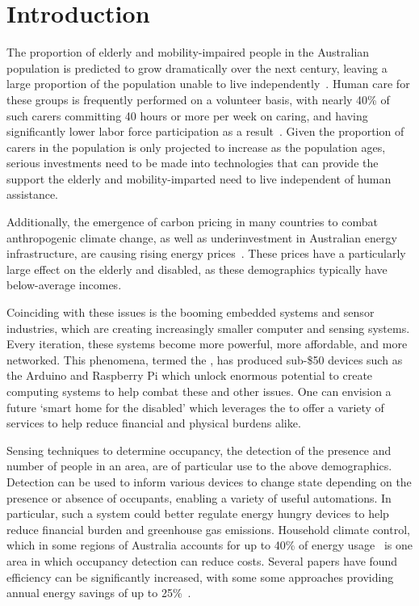 \documentclass[../thesis/thesis.tex]{subfiles}
\begin{document}
\chapter{Introduction}
The proportion of elderly and mobility-impaired people in the Australian population is predicted to grow dramatically over the next century, leaving a large proportion of the population unable to live independently~\cite{chan2009smart}. Human care for these groups is frequently performed on a volunteer basis, with nearly 40\% of such carers committing 40 hours or more per week on caring, and having significantly lower labor force participation as a result~\cite{abs4430}. Given the proportion of carers in the population is only projected to increase as the population ages, serious investments need to be made into technologies that can provide the support the elderly and mobility-imparted need to live independent of human assistance.

Additionally, the emergence of carbon pricing in many countries to combat anthropogenic climate change, as well as underinvestment in Australian energy infrastructure, are causing rising energy prices~\cite{energyprices}. These prices have a particularly large effect on the elderly and disabled, as these demographics typically have below-average incomes.

Coinciding with these issues is the booming embedded systems and sensor industries, which are creating increasingly smaller computer and sensing systems. Every iteration, these systems become more powerful, more affordable, and more networked. This phenomena, termed the \iot, has produced sub-\$50 devices such as the Arduino and Raspberry Pi which unlock enormous potential to create computing systems to help combat these and other issues. One can envision a future `smart home for the disabled' which leverages the \iot to offer a variety of services to help reduce financial and physical burdens alike.

Sensing techniques to determine occupancy, the detection of the presence and number of people in an area, are of particular use to the above demographics. Detection can be used to inform various devices to change state depending on the presence or absence of occupants, enabling a variety of useful automations. In particular, such a system could better regulate energy hungry devices to help reduce financial burden and greenhouse gas emissions. Household climate control, which in some regions of Australia accounts for up to 40\% of energy usage~\cite{abs4602} is one area in which occupancy detection can reduce costs. Several papers have found efficiency can be significantly increased, with some some approaches providing annual energy savings of up to 25\%~\cite{beltran2013thermosense}.
 
\end{document}
